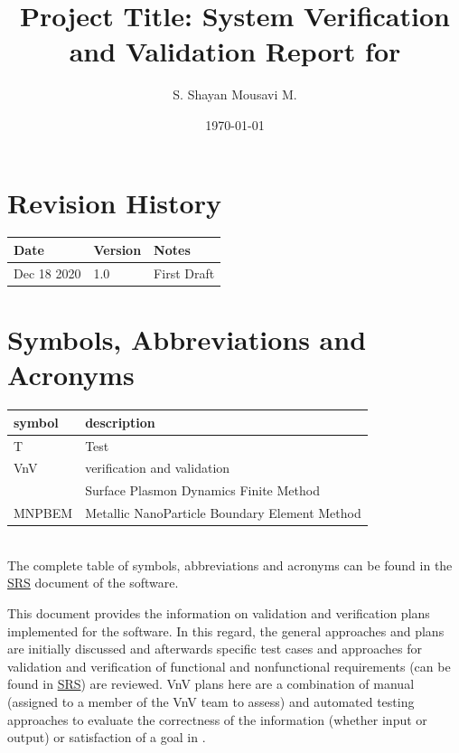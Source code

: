 \documentclass[12pt, titlepage]{article}
\begin{document}
\title{Project Title: System Verification and Validation Report for \progname{}} 
\author{S. Shayan Mousavi M.}
\date{\today}
	
\maketitle


\section{Revision History}

\begin{tabularx}{\textwidth}{p{3cm}p{2cm}X}
\toprule {\bf Date} & {\bf Version} & {\bf Notes}\\
\midrule
Dec 18 2020& 1.0 & First Draft\\
\bottomrule
\end{tabularx}

\newpage

\tableofcontents

\listoftables


\newpage

\section{Symbols, Abbreviations and Acronyms}

\renewcommand{\arraystretch}{1.2}
\begin{tabular}{l l} 
  \toprule		
  \textbf{symbol} & \textbf{description}\\
  \midrule 
  T & Test\\
  VnV & verification and validation\\
  \progname{} & Surface Plasmon Dynamics Finite Method\\
  MNPBEM & Metallic NanoParticle Boundary Element Method\\
  \bottomrule
\end{tabular}\\
The complete table of symbols, abbreviations and acronyms can be found in the \href{https://github.com/shmouses/SPDFM/tree/master/docs/SRS}{SRS} document of the software. 
\newpage


This document provides the information on validation and verification plans implemented for the \progname{} software. In this regard, the general approaches and plans are initially discussed and afterwards specific test cases and approaches for validation and verification of functional and nonfunctional requirements (can be found in \href{https://github.com/shmouses/SPDFM/tree/master/docs/SRS}{SRS}) are reviewed. VnV plans here are a combination of manual (assigned to a member of the VnV team to assess) and automated testing approaches to evaluate the correctness of the information (whether input or output) or satisfaction of a goal in \progname{}.    
\end{document}

